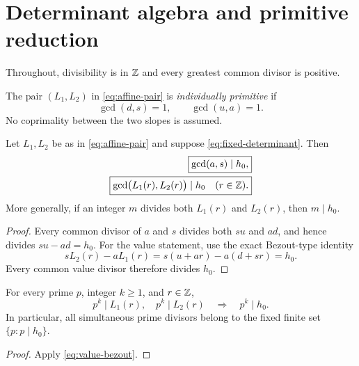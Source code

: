 \section{Determinant algebra and primitive reduction}
\label{sec:determinant-algebra}

Throughout, divisibility is in \(\mathbb Z\) and every greatest common
divisor is positive.

\begin{definition}
\label{def:primitive-affine-pair}
The pair \((L_1,L_2)\) in \eqref{eq:affine-pair} is
\emph{individually primitive} if
\[
 \gcd(d,s)=1,\qquad \gcd(u,a)=1.
\]
No coprimality between the two slopes is assumed.
\end{definition}

\begin{theorem}
\label{thm:gcd-confinement}
Let \(L_1,L_2\) be as in \eqref{eq:affine-pair} and suppose
\eqref{eq:fixed-determinant}.  Then
\begin{align}
 \boxed{\gcd(a,s)\mid h_0,}
\label{eq:slope-gcd}\\
 \boxed{\gcd\bigl(L_1(r),L_2(r)\bigr)\mid h_0
 \quad(r\in\mathbb Z).}
\label{eq:value-gcd}
\end{align}
More generally, if an integer \(m\) divides both \(L_1(r)\) and
\(L_2(r)\), then \(m\mid h_0\).
\end{theorem}

\begin{proof}
Every common divisor of \(a\) and \(s\) divides both \(su\) and
\(ad\), and hence divides \(su-ad=h_0\).  For the value statement,
use the exact Bezout-type identity
\begin{equation}
 sL_2(r)-aL_1(r)
 =s(u+ar)-a(d+sr)
 =h_0.
\label{eq:value-bezout}
\end{equation}
Every common value divisor therefore divides \(h_0\).
\end{proof}

\begin{corollary}
\label{cor:common-prime-powers}
For every prime \(p\), integer \(k\ge1\), and \(r\in\mathbb Z\),
\[
 p^k\mid L_1(r),\quad p^k\mid L_2(r)
 \quad\Longrightarrow\quad
 p^k\mid h_0.
\]
In particular, all simultaneous prime divisors belong to the fixed
finite set \(\{p:p\mid h_0\}\).
\end{corollary}

\begin{proof}
Apply \eqref{eq:value-bezout}.
\end{proof}

